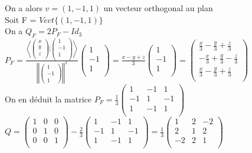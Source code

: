 \documentclass{article}
\newcommand{\scalaire}[2]{\left< #1 | #2\right>}
\begin{document}
On a alors $v = (1, -1, 1)$ un vecteur orthogonal au plan\\
Soit F = $Vect \{(1, -1, 1)\}$\\
On a $Q_F = 2 P_F - Id_3$\\
$P_F = \frac{\scalaire{\begin{pmatrix}
    x\\
    y\\
    z\\
\end{pmatrix}}{\begin{pmatrix}
    1\\
    -1\\
    1\\
\end{pmatrix}}}{\left|\left|\begin{pmatrix}
    1\\
    -1\\
    1
\end{pmatrix}\right|\right|^2}\begin{pmatrix}
    1\\
    -1\\
    1\\
\end{pmatrix} = \frac{x - y + z}{3}\begin{pmatrix}
    1\\
    -1\\
    1\\
\end{pmatrix} = \begin{pmatrix}
    \frac{x}{3} -\frac{y}{3} + \frac{z}{3}\\ 
    -\frac{x}{3} +\frac{y}{3} - \frac{z}{3}\\ 
    \frac{x}{3} -\frac{y}{3} + \frac{z}{3}\\ 
\end{pmatrix}$\\
On en déduit la matrice $P_F = \frac{1}{3}\begin{pmatrix}
    1 & -1 & 1\\
    -1 & 1 & -1\\
    1 & -1 & 1\\
\end{pmatrix}$\\
$Q = \begin{pmatrix}
    1 & 0 & 0\\
    0 & 1 & 0\\
    0 & 0 & 1\\
\end{pmatrix} - \frac{2}{3} \begin{pmatrix}
    1 & -1 & 1\\
    -1 & 1 & -1\\
    1 & -1 & 1\\
\end{pmatrix} = \frac{1}{3} \begin{pmatrix}
    1 & 2 & -2\\
    2 & 1 & 2\\
    -2 & 2 & 1\\
\end{pmatrix}$\vspace{3mm}\\
\end{document}
